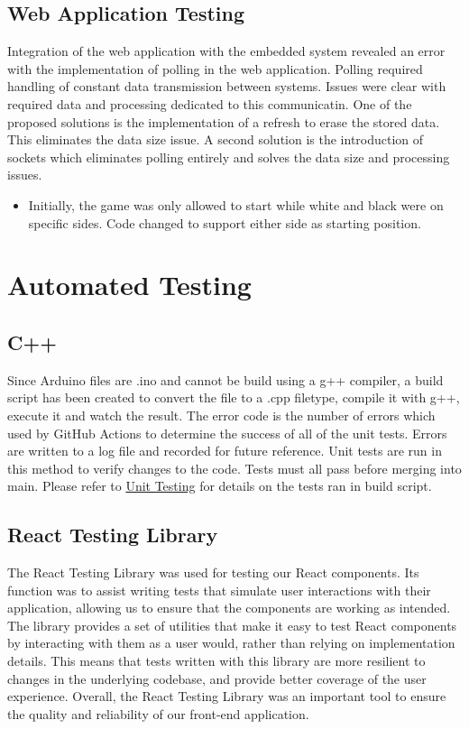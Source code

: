 \documentclass[12pt, titlepage]{article}
\begin{document}
\subsection{Web Application Testing}
Integration of the web application with the embedded system revealed an error 
with the implementation of polling in the web application. Polling required 
handling of constant data transmission between systems. Issues were clear with 
required data and processing dedicated to this communicatin. One of the proposed
solutions is the implementation of a refresh to erase the stored data. This 
eliminates the data size issue. A second solution is the introduction of sockets
which eliminates polling entirely and solves the data size and processing issues. 


\begin{itemize}
  \item Initially, the game was only allowed to start while white and black were on specific sides. Code changed to support either side as starting position.
\end{itemize}
  

\section{Automated Testing}
\subsection{C++}
  Since Arduino files are .ino and cannot be build using a g++ compiler, a build script has been created to convert the file to a .cpp filetype, compile it with
  g++, execute it and watch the result. The error code is the number of errors which used by GitHub Actions to determine the success of all of the unit tests. Errors
  are written to a log file and recorded for future reference. Unit tests are run in this method to verify changes to the code. Tests must all pass before merging
  into main. Please refer to \hyperref[UnitTest]{Unit Testing} for details on the tests ran in build script.

\subsection{React Testing Library}
The React Testing Library was used for testing our React components. 
Its function was to assist writing tests that simulate user 
interactions with their application, allowing us to ensure that the components 
are working as intended. The library provides a set of utilities that make it 
easy to test React components by interacting with them as a user would, rather 
than relying on implementation details. This means that tests written with this library
are more resilient to changes in the underlying codebase, and 
provide better coverage of the user experience. Overall, the React Testing Library
was an important tool to ensure the quality and reliability
of our front-end application.
		
\end{document}

